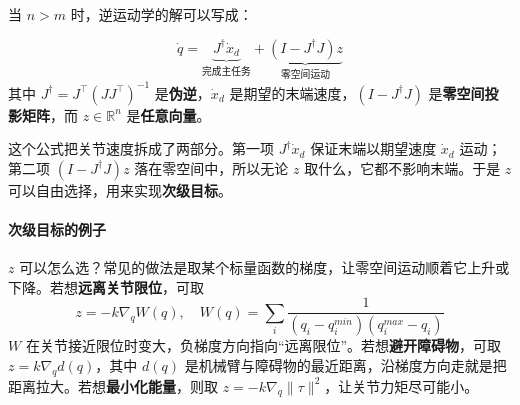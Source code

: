 当 $n > m$ 时，逆运动学的解可以写成：

\begin{keyformula}[title=冗余逆运动学的通解]
\begin{equation}
\dot{q} = \underbrace{J^\dagger \dot{x}_d}_{\text{完成主任务}} + \underbrace{(I - J^\dagger J) z}_{\text{零空间运动}}
\end{equation}
其中 $J^\dagger = J^\top(JJ^\top)^{-1}$ 是\textbf{伪逆}，$\dot{x}_d$ 是期望的末端速度，$(I - J^\dagger J)$ 是\textbf{零空间投影矩阵}，而 $z \in \mathbb{R}^n$ 是\textbf{任意向量}。
\end{keyformula}

\begin{physicalmeaning}
这个公式把关节速度拆成了两部分。第一项 $J^\dagger \dot{x}_d$ 保证末端以期望速度 $\dot{x}_d$ 运动；第二项 $(I - J^\dagger J) z$ 落在零空间中，所以无论 $z$ 取什么，它都不影响末端。于是 $z$ 可以自由选择，用来实现\textbf{次级目标}。
\end{physicalmeaning}

\paragraph{次级目标的例子}

$z$ 可以怎么选？常见的做法是取某个标量函数的梯度，让零空间运动顺着它上升或下降。若想\textbf{远离关节限位}，可取
\[
z = -k \nabla_q W(q), \quad W(q) = \sum_i \frac{1}{(q_i - q_i^{min})(q_i^{max} - q_i)}
\]
$W$ 在关节接近限位时变大，负梯度方向指向“远离限位”。若想\textbf{避开障碍物}，可取 $z = k \nabla_q d(q)$，其中 $d(q)$ 是机械臂与障碍物的最近距离，沿梯度方向走就是把距离拉大。若想\textbf{最小化能量}，则取 $z = -k \nabla_q \|\tau\|^2$，让关节力矩尽可能小。

